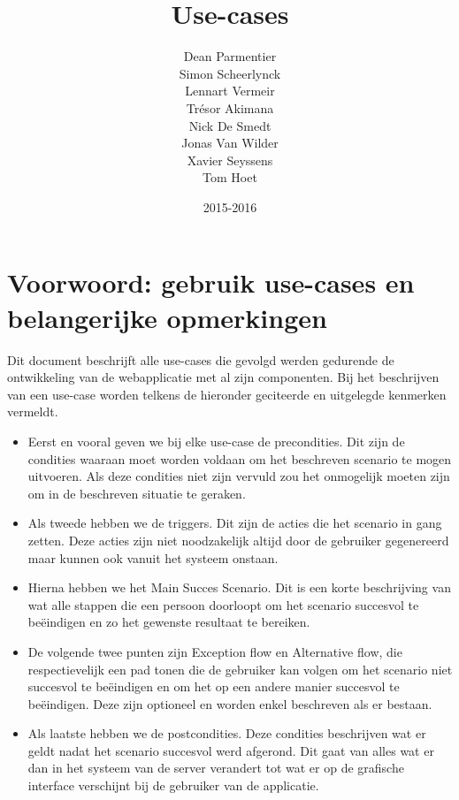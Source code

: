 \documentclass[11pt,twoside,a4paper]{article}
\author{
	Dean Parmentier\\
	Simon Scheerlynck\\
	Lennart Vermeir\\
	Tr\'esor Akimana\\
	Nick De Smedt\\
	Jonas Van Wilder\\
	Xavier Seyssens\\
	Tom Hoet
}
\date{2015-2016}
\title{Use-cases}
\begin{document}
	



\section*{Voorwoord: gebruik use-cases en belangerijke opmerkingen}\label{intro}
	
	Dit document beschrijft alle use-cases die gevolgd werden gedurende de ontwikkeling van de webapplicatie met al zijn componenten.
Bij het beschrijven van een use-case worden telkens de hieronder geciteerde en uitgelegde kenmerken vermeldt.
	\begin{itemize}
	\item Eerst en vooral geven we bij elke use-case de precondities. Dit zijn de condities waaraan moet worden voldaan om het beschreven scenario te mogen uitvoeren. Als deze condities niet zijn vervuld zou het onmogelijk moeten zijn om in de beschreven situatie te geraken.
	\item Als tweede hebben we de triggers. Dit zijn de acties die het scenario in gang zetten. Deze acties zijn niet noodzakelijk altijd door de gebruiker gegenereerd maar kunnen ook vanuit het systeem onstaan. 
	\item Hierna hebben we het Main Succes Scenario. Dit is een korte beschrijving van wat alle stappen die een persoon doorloopt om het scenario succesvol te be\"eindigen en zo het gewenste resultaat te bereiken. 
	\item De volgende twee punten zijn Exception flow en Alternative flow, die respectievelijk een pad tonen die de gebruiker kan volgen om het scenario niet succesvol te be\"eindigen en om het op een andere manier succesvol te be\"eindigen. Deze zijn optioneel en worden enkel beschreven als er bestaan.
	\item Als laatste hebben we de postcondities. Deze condities beschrijven wat er geldt nadat het scenario succesvol werd afgerond. Dit gaat van alles wat er dan in het systeem van de server verandert tot wat er op de grafische interface verschijnt bij de gebruiker van de applicatie. 
\end{itemize}
\end{document}

